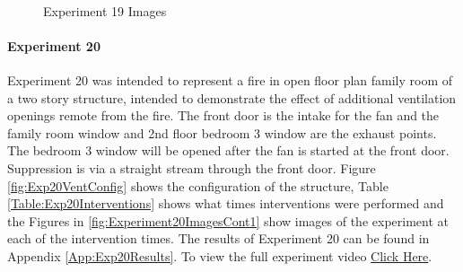 \documentclass{article}
\begin{document}
\begin{figure}[H]
	\ContinuedFloat 
	\centering 
	 \ 
	\caption{Experiment 19 Images}
	\label{fig:Experiment19ImagesCont3} 
\end{figure}

\paragraph{Experiment 20}\mbox{}

Experiment 20 was intended to represent a fire in open floor plan family room of a two story structure, intended to demonstrate the effect of additional ventilation openings remote from the fire. The front door is the intake for the fan and the family room window and 2nd floor bedroom 3 window are the exhaust points. The bedroom 3 window will be opened after the fan is started at the front door. Suppression is via a straight stream through the front door. Figure \ref{fig:Exp20VentConfig} shows the configuration of the structure, Table \ref{Table:Exp20Interventions} shows what times interventions were performed and the Figures in \ref{fig:Experiment20ImagesCont1} show images of the experiment at each of the intervention times. The results of Experiment 20 can be found in Appendix \ref{App:Exp20Results}. To view the full experiment video \href{https://youtu.be/lMBMZXApou4}{Click Here}.
\end{document}
